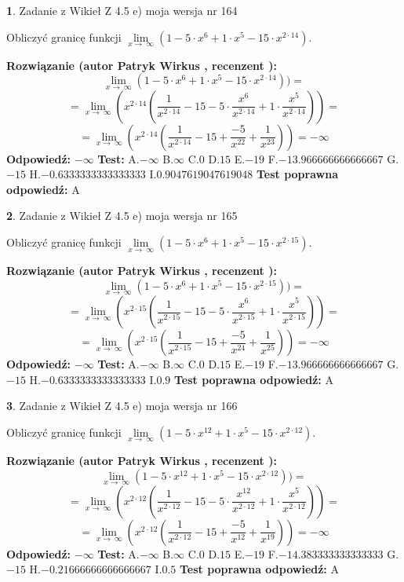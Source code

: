 \documentclass[12pt, a4paper]{article}
\theoremstyle{definition} %
\newtheorem{zad}{}
\newcommand{\zadStart}[1]{\begin{zad}#1\newline}
\newcommand{\zadStop}{\end{zad}}
\newcommand{\rozwStart}[2]{\noindent \textbf{Rozwiązanie (autor #1 , recenzent #2): }\newline}
\newcommand{\rozwStop}{\newline}
\newcommand{\odpStart}{\noindent \textbf{Odpowiedź:}\newline}
\newcommand{\odpStop}{\newline}
\newcommand{\testStart}{\noindent \textbf{Test:}\newline}
\newcommand{\testStop}{\newline}
\newcommand{\kluczStart}{\noindent \textbf{Test poprawna odpowiedź:}\newline}
\newcommand{\kluczStop}{\newline}
\begin{document}
\zadStart{Zadanie z Wikieł Z 4.5 e) moja wersja nr 164}


Obliczyć granicę funkcji  $\lim\limits_{x\to\ \infty}(1 - 5 \cdot x^{6}+1 \cdot x^{5}- 15 \cdot x^{2\cdot14})$.
\zadStop
\rozwStart{Patryk Wirkus}{}
$$\lim\limits_{x\to\ \infty}(1 - 5 \cdot x^{6}+1 \cdot x^{5}- 15 \cdot x^{2\cdot14}))=$$
$$=\lim\limits_{x\to\ \infty}(x^{2\cdot14}(\frac{1}{x^{2\cdot14}}-15 -5 \cdot \frac{x^{6}}{x^{2\cdot14}}+1 \cdot \frac{x^{5}}{x^{2\cdot14}}))=$$
$$=\lim\limits_{x\to\ \infty}(x^{2\cdot14}(\frac{1}{x^{2\cdot14}}-15 + \frac{-5}{x^{22}}+ \frac{1}{x^{23}}))=-\infty$$
\rozwStop
\odpStart
$-\infty$
\odpStop
\testStart
A.$-\infty$ B.$\infty$ C.$0$ D.$15$ E.$-19$
F.$-13.966666666666667$ G.$-15$
H.$-0.6333333333333333$
I.$0.9047619047619048$
\testStop
\kluczStart
A
\kluczStop



\zadStart{Zadanie z Wikieł Z 4.5 e) moja wersja nr 165}


Obliczyć granicę funkcji  $\lim\limits_{x\to\ \infty}(1 - 5 \cdot x^{6}+1 \cdot x^{5}- 15 \cdot x^{2\cdot15})$.
\zadStop
\rozwStart{Patryk Wirkus}{}
$$\lim\limits_{x\to\ \infty}(1 - 5 \cdot x^{6}+1 \cdot x^{5}- 15 \cdot x^{2\cdot15}))=$$
$$=\lim\limits_{x\to\ \infty}(x^{2\cdot15}(\frac{1}{x^{2\cdot15}}-15 -5 \cdot \frac{x^{6}}{x^{2\cdot15}}+1 \cdot \frac{x^{5}}{x^{2\cdot15}}))=$$
$$=\lim\limits_{x\to\ \infty}(x^{2\cdot15}(\frac{1}{x^{2\cdot15}}-15 + \frac{-5}{x^{24}}+ \frac{1}{x^{25}}))=-\infty$$
\rozwStop
\odpStart
$-\infty$
\odpStop
\testStart
A.$-\infty$ B.$\infty$ C.$0$ D.$15$ E.$-19$
F.$-13.966666666666667$ G.$-15$
H.$-0.6333333333333333$
I.$0.9$
\testStop
\kluczStart
A
\kluczStop



\zadStart{Zadanie z Wikieł Z 4.5 e) moja wersja nr 166}


Obliczyć granicę funkcji  $\lim\limits_{x\to\ \infty}(1 - 5 \cdot x^{12}+1 \cdot x^{5}- 15 \cdot x^{2\cdot12})$.
\zadStop
\rozwStart{Patryk Wirkus}{}
$$\lim\limits_{x\to\ \infty}(1 - 5 \cdot x^{12}+1 \cdot x^{5}- 15 \cdot x^{2\cdot12}))=$$
$$=\lim\limits_{x\to\ \infty}(x^{2\cdot12}(\frac{1}{x^{2\cdot12}}-15 -5 \cdot \frac{x^{12}}{x^{2\cdot12}}+1 \cdot \frac{x^{5}}{x^{2\cdot12}}))=$$
$$=\lim\limits_{x\to\ \infty}(x^{2\cdot12}(\frac{1}{x^{2\cdot12}}-15 + \frac{-5}{x^{12}}+ \frac{1}{x^{19}}))=-\infty$$
\rozwStop
\odpStart
$-\infty$
\odpStop
\testStart
A.$-\infty$ B.$\infty$ C.$0$ D.$15$ E.$-19$
F.$-14.383333333333333$ G.$-15$
H.$-0.21666666666666667$
I.$0.5$
\testStop
\kluczStart
A
\kluczStop
\end{document}
